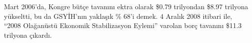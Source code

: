 \documentclass{article}
\begin{document}

Mart 2006'da, Kongre bütçe tavanını ektra olarak
 \$0.79 trilyondan \$8.97 trilyona yükseltti,
bu da GSYİH'nın yaklaşık \% 68'i demek. 4 Aralık 2008 
itibari ile, ``2008 Olağanüstü Ekonomik Stabilizasyon Eylemi'' 
varolan borç tavanını \$11.3 trilyona çıkardı.
\end{document}

